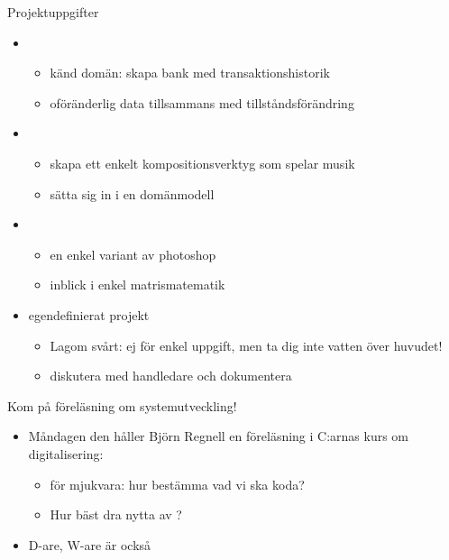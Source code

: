 \begin{Slide}{Projektuppgifter}\SlideFontTiny

\begin{itemize}\SlideFontTiny
\item {}
\begin{itemize}\SlideFontTiny
\item känd domän: skapa bank med transaktionshistorik 
\item oföränderlig data tillsammans med tillståndsförändring
\end{itemize}


\item {}
\begin{itemize}\SlideFontTiny
\item skapa ett enkelt kompositionsverktyg som spelar musik
\item sätta sig in i en domänmodell
\end{itemize}

\item {} 
\begin{itemize}\SlideFontTiny
\item en enkel variant av photoshop 
\item inblick i enkel matrismatematik
\end{itemize}


\item egendefinierat projekt 
\begin{itemize}\SlideFontTiny
\item Lagom svårt: ej för enkel uppgift, men ta dig inte vatten över huvudet!
\item diskutera med handledare och dokumentera
\end{itemize}


\end{itemize}

\end{Slide}

\ifkompendium\else


\begin{SlideExtra}{Kom på föreläsning om systemutveckling!}
\begin{itemize}
  \item Måndagen den  håller Björn Regnell en föreläsning i C:arnas kurs om digitalisering: 
\begin{itemize}
  \item {} för mjukvara: hur bestämma vad vi ska koda?
  \item Hur bäst dra nytta av ?
\end{itemize}
  \item D-are, W-are är också 
\end{itemize}
  
\end{SlideExtra}

